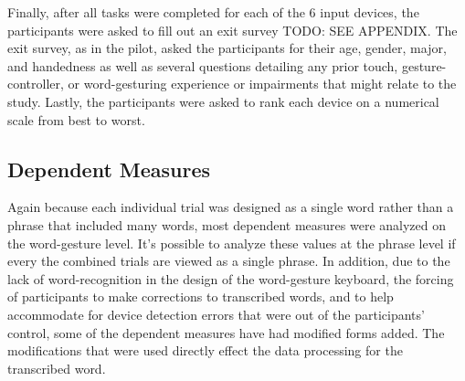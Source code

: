 Finally, after all tasks were completed for each of the 6 input devices, the participants were asked to fill out an exit survey TODO: SEE APPENDIX. The exit survey, as in the pilot, asked the participants for their age, gender, major, and handedness as well as several questions detailing any prior touch, gesture-controller, or word-gesturing experience or impairments that might relate to the study. Lastly, the participants were asked to rank each device on a numerical scale from best to worst.

\begin{table}[h] %
	\centering
	\caption[Final Study Schedule of Assessments]{\centering Schedule of Assessments for a single study visit (in minutes).}
	\label{final_schedule_of_assessments}
\end{table}

\subsection{Dependent Measures} \label{final_dependent_measures}
Again because each individual trial was designed as a single word rather than a phrase that included many words, most dependent measures were analyzed on the word-gesture level. It's possible to analyze these values at the phrase level if every the combined trials are viewed as a single phrase. In addition, due to the lack of word-recognition in the design of the word-gesture keyboard, the forcing of participants to make corrections to transcribed words, and to help accommodate for device detection errors that were out of the participants' control, some of the dependent measures have had modified forms added. The modifications that were used directly effect the data processing for the transcribed word.

